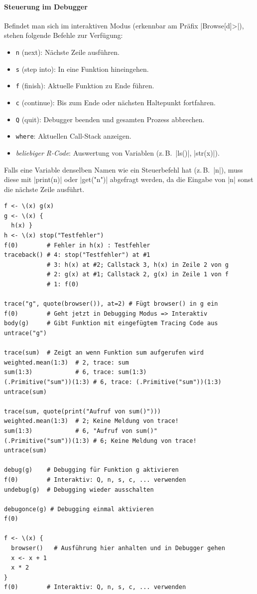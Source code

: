 \documentclass[10pt,twocolumn]{scrartcl}
\renewcommand{\lstinline}{\mycoloredinline}
\begin{document}
\paragraph{Steuerung im Debugger}

Befindet man sich im interaktiven Modus (erkennbar am Präfix \lstinline|Browse[d]>|), stehen folgende Befehle zur Verfügung:

\begin{itemize}
\item \texttt{n} (next): Nächste Zeile ausführen.
\item \texttt{s} (step into): In eine Funktion hineingehen.
\item \texttt{f} (finish): Aktuelle Funktion zu Ende führen.
\item \texttt{c} (continue): Bis zum Ende oder nächsten Haltepunkt fortfahren.
\item \texttt{Q} (quit): Debugger beenden und gesamten Prozess abbrechen.
\item \texttt{where}: Aktuellen Call-Stack anzeigen.
\item \textit{beliebiger R-Code}: Auswertung von Variablen (z.\,B.\ \lstinline|ls()|, \lstinline|str(x)|).
\end{itemize}

Falls eine Variable denselben Namen wie ein Steuerbefehl hat (z.\,B.\ \lstinline|n|), muss diese mit \lstinline|print(n)| oder \lstinline|get("n")| abgefragt werden, da die Eingabe von \lstinline|n| sonst die nächste Zeile ausführt.

\begin{lstlisting}
f <- \(x) g(x)
g <- \(x) {
  h(x) }
h <- \(x) stop("Testfehler")
f(0)        # Fehler in h(x) : Testfehler
traceback() # 4: stop("Testfehler") at #1
            # 3: h(x) at #2; Callstack 3, h(x) in Zeile 2 von g
            # 2: g(x) at #1; Callstack 2, g(x) in Zeile 1 von f
            # 1: f(0)

trace("g", quote(browser()), at=2) # Fügt browser() in g ein
f(0)        # Geht jetzt in Debugging Modus => Interaktiv
body(g)     # Gibt Funktion mit eingefügtem Tracing Code aus
untrace("g")

trace(sum)  # Zeigt an wenn Funktion sum aufgerufen wird
weighted.mean(1:3)  # 2, trace: sum
sum(1:3)            # 6, trace: sum(1:3)
(.Primitive("sum"))(1:3) # 6, trace: (.Primitive("sum"))(1:3)
untrace(sum)

trace(sum, quote(print("Aufruf von sum()")))
weighted.mean(1:3)  # 2; Keine Meldung von trace!
sum(1:3)            # 6, "Aufruf von sum()"
(.Primitive("sum"))(1:3) # 6; Keine Meldung von trace!
untrace(sum)

debug(g)    # Debugging für Funktion g aktivieren
f(0)        # Interaktiv: Q, n, s, c, ... verwenden
undebug(g)  # Debugging wieder ausschalten

debugonce(g) # Debugging einmal aktivieren
f(0)

f <- \(x) {
  browser()   # Ausführung hier anhalten und in Debugger gehen
  x <- x + 1
  x * 2
}
f(0)        # Interaktiv: Q, n, s, c, ... verwenden
\end{lstlisting}
\end{document}
